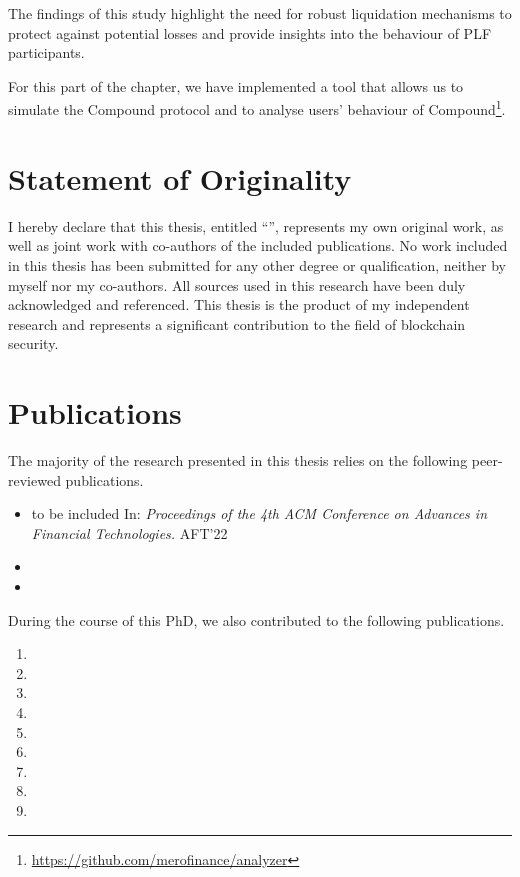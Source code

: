 The findings of this study highlight the need for robust liquidation mechanisms to protect against potential losses and provide insights into the behaviour of PLF participants.

For this part of the chapter, we have implemented a tool that allows us to simulate the Compound protocol and to analyse users' behaviour of Compound\footnote{\url{https://github.com/merofinance/analyzer}}.

\section{Statement of Originality}
I hereby declare that this thesis, entitled ``\thesistitle'', represents my own original work, as well as joint work with co-authors of the included publications.
No work included in this thesis has been submitted for any other degree or qualification, neither by myself nor my co-authors.
All sources used in this research have been duly acknowledged and referenced.
This thesis is the product of my independent research and represents a significant contribution to the field of blockchain security.

\section{Publications}

The majority of the research presented in this thesis relies on the following peer-reviewed publications.

 
 
\begin{itemize}
	\item {} to be included In: \emph{Proceedings of the 4th ACM Conference on Advances in Financial Technologies.} AFT'22
	\item {}
	\item {}
\end{itemize}

During the course of this PhD, we also contributed to the following publications.

\begin{enumerate}
	\item {}
	\item {}
	\item {}
	\item {}
	\item {}
	\item {}
	\item {}
	\item {}
	\item {}
\end{enumerate}
